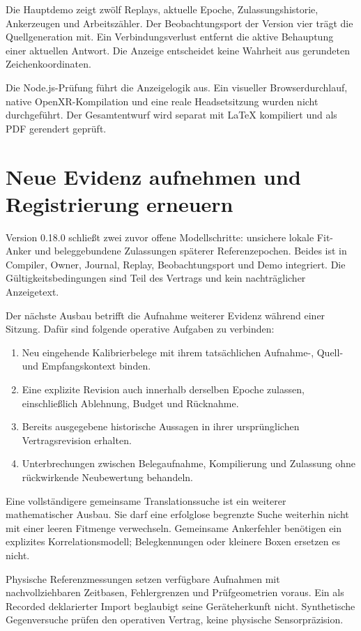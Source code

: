 \documentclass[11pt,a4paper]{article}
\newcommand{\nextsection}[2]{\clearpage{\color{accent}\small\textsf{#1}}\section{#2}}
\begin{document}
Die Hauptdemo zeigt zwölf Replays, aktuelle Epoche, Zulassungshistorie,
Ankerzeugen und Arbeitszähler. Der Beobachtungsport der Version vier
trägt die Quellgeneration mit. Ein Verbindungsverlust entfernt die
aktive Behauptung einer aktuellen Antwort. Die Anzeige entscheidet
keine Wahrheit aus gerundeten Zeichenkoordinaten.

Die Node.js-Prüfung führt die Anzeigelogik aus. Ein visueller
Browserdurchlauf, native OpenXR-Kompilation und eine reale
Headsetsitzung wurden nicht durchgeführt. Der Gesamtentwurf wird
separat mit LaTeX kompiliert und als PDF gerendert geprüft.

\nextsection{113 / NÄCHSTER AUSBAU}{Neue Evidenz aufnehmen und Registrierung erneuern}
Version 0.18.0 schließt zwei zuvor offene Modellschritte:
unsichere lokale Fit-Anker und beleggebundene Zulassungen späterer
Referenzepochen. Beides ist in Compiler, Owner, Journal, Replay,
Beobachtungsport und Demo integriert. Die Gültigkeitsbedingungen
sind Teil des Vertrags und kein nachträglicher Anzeigetext.

Der nächste Ausbau betrifft die Aufnahme weiterer Evidenz während
einer Sitzung. Dafür sind folgende operative Aufgaben zu verbinden:
\begin{enumerate}
\item Neu eingehende Kalibrierbelege mit ihrem tatsächlichen
Aufnahme-, Quell- und Empfangskontext binden.
\item Eine explizite Revision auch innerhalb derselben Epoche
zulassen, einschließlich Ablehnung, Budget und Rücknahme.
\item Bereits ausgegebene historische Aussagen in ihrer
ursprünglichen Vertragsrevision erhalten.
\item Unterbrechungen zwischen Belegaufnahme, Kompilierung und
Zulassung ohne rückwirkende Neubewertung behandeln.
\end{enumerate}

Eine vollständigere gemeinsame Translationssuche ist ein weiterer
mathematischer Ausbau. Sie darf eine erfolglose begrenzte Suche
weiterhin nicht mit einer leeren Fitmenge verwechseln. Gemeinsame
Ankerfehler benötigen ein explizites Korrelationsmodell;
Belegkennungen oder kleinere Boxen ersetzen es nicht.

Physische Referenzmessungen setzen verfügbare Aufnahmen mit
nachvollziehbaren Zeitbasen, Fehlergrenzen und Prüfgeometrien
voraus. Ein als Recorded deklarierter Import beglaubigt seine
Geräteherkunft nicht. Synthetische Gegenversuche prüfen den
operativen Vertrag, keine physische Sensorpräzision.
\end{document}
